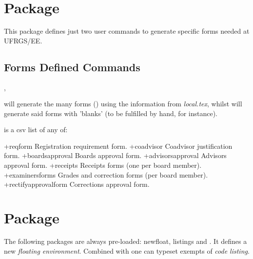 \documentclass[dctools,english]{ufrgscca} %
\begin{document}
\section{ Package}
This package defines just two user commands to generate specific forms needed at UFRGS/EE.
\subsection{Forms Defined Commands}\label{forms.commands}
\begin{Macros}{\tcforms,\tcemptyforms}
	\begin{Syntax}%
\end{Syntax}
\Macro{\tcforms}{} will generate the many forms () using the information from \emph{local.tex}, whilst \Macro{\tcemptyforms}{} will generate said forms with 'blanks' (to be fulfilled by hand, for instance).

 is a csv list of any of:
\begin{Options+}
    \DescribeOption+{reqform} Registration requirement form.
    \DescribeOption+{coadvisor} Coadvisor justification form.
    \DescribeOption+{boardsapproval} Boards approval form.
    \DescribeOption+{advisorsapproval} Advisors approval form.
    \DescribeOption+{receipts} Receipts forms (one per board member).
    \DescribeOption+{examinersforms} Grades and correction forms (per board member).
    \DescribeOption+{rectifyapprovalform} Corrections approval  form.
\end{Options+}

\end{Macros}


\section{ Package}
The following packages are always pre-loaded: {\MetaFmt[Pack]\sffamily newfloat, listings} and .
It defines a new \emph{floating environment}. Combined with  one can typeset exempts of \emph{code listing}.
\end{document}
